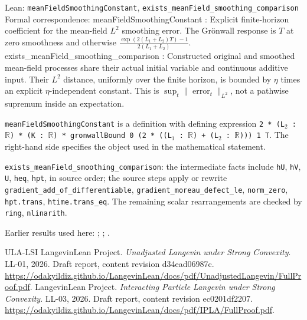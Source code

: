 \documentclass[11pt,a4paper]{article}
\begin{document}
\begin{leanbox}{Lean: \texttt{meanFieldSmoothingConstant}, \texttt{exists\_\allowbreak{}meanField\_\allowbreak{}smoothing\_\allowbreak{}comparison}}
Formal correspondence: meanFieldSmoothingConstant : Explicit finite-horizon coefficient for the mean-field \(L^2\) smoothing error. The Grönwall response is \(T\) at zero smoothness and otherwise \(\frac{\exp(2(L_1+L_2)T)-1}{2(L_1+L_2)}\). exists\_meanField\_smoothing\_comparison : Constructed original and smoothed mean-field processes share their actual initial variable and continuous additive input. Their \(L^2\) distance, uniformly over the finite horizon, is bounded by \(\eta\) times an explicit \(\eta\)-independent constant. This is \(\sup_t\|\operatorname{error}_t\|_{L^2}\), not a pathwise supremum inside an expectation.



\texttt{mean\allowbreak{}Field\allowbreak{}Smoothing\allowbreak{}Constant} is a definition with defining expression \texttt{2 * (L\ensuremath{{}_{2}} : \ensuremath{\mathbb R}) * (K : \ensuremath{\mathbb R}) * gronwall\allowbreak{}Bound 0 (2 * ((L\ensuremath{{}_{1}} : \ensuremath{\mathbb R}) + (L\ensuremath{{}_{2}} : \ensuremath{\mathbb R}))) 1 T}. The right-hand side specifies the object used in the mathematical statement.



\texttt{exists\_\allowbreak{}mean\allowbreak{}Field\_\allowbreak{}smoothing\_\allowbreak{}comparison}: the intermediate facts include \texttt{h\allowbreak{}U}, \texttt{h\allowbreak{}V}, \texttt{U}, \texttt{heq}, \texttt{hpt}, in source order; the source steps apply or rewrite \texttt{gradient\_\allowbreak{}add\_\allowbreak{}of\_\allowbreak{}differentiable}, \texttt{gradient\_\allowbreak{}moreau\_\allowbreak{}defect\_\allowbreak{}le}, \texttt{norm\_\allowbreak{}zero}, \texttt{hpt.\allowbreak{}trans}, \texttt{htime.\allowbreak{}trans\_\allowbreak{}eq}. The remaining scalar rearrangements are checked by \texttt{ring}, \texttt{nlinarith}.
\end{leanbox}


Earlier results used here: \cite[Section~3.13.2]{LangevinLean2026ULASC}; \cite[Section~3.13.3]{LangevinLean2026ULASC}; \cite[Section~3.1.1]{LangevinLean2026IPLA}.

\begin{thebibliography}{ULA-LSI}
LangevinLean Project. \emph{Unadjusted Langevin under Strong Convexity}. LL-01, 2026. Draft report, content revision d34ead06987c. \url{https://odakyildiz.github.io/LangevinLean/docs/pdf/UnadjustedLangevin/FullProof.pdf}.
LangevinLean Project. \emph{Interacting Particle Langevin under Strong Convexity}. LL-03, 2026. Draft report, content revision ec0201df2207. \url{https://odakyildiz.github.io/LangevinLean/docs/pdf/IPLA/FullProof.pdf}.
\end{thebibliography}
\end{document}
